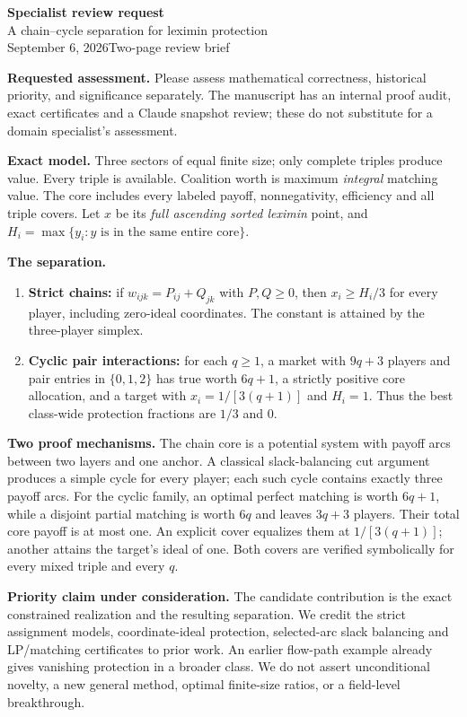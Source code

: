 \documentclass[11pt]{article}
\begin{document}
\begin{center}
{\Large\bfseries Specialist review request}\\[5pt]
{\large A chain--cycle separation for leximin protection}\\[3pt]
September 6, 2026\quad\textbullet\quad Two-page review brief
\end{center}

\textbf{Requested assessment.} Please assess mathematical correctness,
historical priority, and significance separately. The manuscript has an
internal proof audit, exact certificates and a Claude snapshot review;
these do not substitute for a domain specialist's assessment.

\textbf{Exact model.} Three sectors of equal finite size; only complete
triples produce value. Every triple is available. Coalition worth is
maximum \emph{integral} matching value. The core includes every labeled
payoff, nonnegativity, efficiency and all triple covers. Let $x$ be its
\emph{full ascending sorted leximin} point, and
$H_i=\max\{y_i:y\text{ is in the same entire core}\}$.

\textbf{The separation.}
\begin{enumerate}
\item \textbf{Strict chains:} if $w_{ijk}=P_{ij}+Q_{jk}$ with $P,Q\geq0$,
then $x_i\geq H_i/3$ for every player, including zero-ideal coordinates.
The constant is attained by the three-player simplex.
\item \textbf{Cyclic pair interactions:} for each $q\geq1$, a market with
$9q+3$ players and pair entries in $\{0,1,2\}$ has true worth $6q+1$,
a strictly positive core allocation, and a target with
$x_i=1/[3(q+1)]$ and $H_i=1$.
Thus the best class-wide protection fractions are $1/3$ and $0$.
\end{enumerate}

\textbf{Two proof mechanisms.} The chain core is a potential system with
payoff arcs between two layers and one anchor. A classical slack-balancing
cut argument produces a simple cycle for every player; each such cycle
contains exactly three payoff arcs. For the cyclic family, an optimal
perfect matching is worth $6q+1$, while a disjoint partial matching is
worth $6q$ and leaves $3q+3$ players. Their total core payoff is at most
one. An explicit cover equalizes them at $1/[3(q+1)]$; another attains
the target's ideal of one. Both covers are verified symbolically for
every mixed triple and every $q$.

\textbf{Priority claim under consideration.} The candidate contribution
is the exact constrained realization and the resulting separation. We
credit the strict assignment models, coordinate-ideal protection,
selected-arc slack balancing and LP/matching certificates to prior work.
An earlier flow-path example already gives vanishing protection in a
broader class. We do not assert unconditional novelty, a new general
method, optimal finite-size ratios, or a field-level breakthrough.
\end{document}
